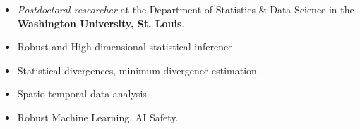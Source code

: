 \documentclass[10pt]{developercv} %
\begin{document}
\begin{itemize}[noitemsep, leftmargin=*]
    \item \emph{Postdoctoral researcher} at the Department of Statistics \& Data Science in the \textbf{Washington University, St. Louis}.
\end{itemize}

\vspace*{-0.4cm}
\vspace{-15pt}


\begin{itemize}[noitemsep, leftmargin=*]
    \item Robust and High-dimensional statistical inference.
    \item Statistical divergences, minimum divergence estimation.
    \item Spatio-temporal data analysis.
    \item Robust Machine Learning, AI Safety.
\end{itemize}
\end{document}
